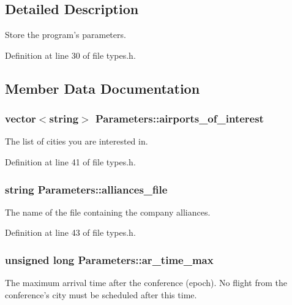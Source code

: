 \subsection{Detailed Description}
Store the program's parameters. 

Definition at line 30 of file types.\-h.



\subsection{Member Data Documentation}
\hypertarget{struct_parameters_a119abefcf756bb820a8b03929bfaaa7d}{
\subsubsection[{airports\-\_\-of\-\_\-interest}]{\setlength{\rightskip}{0pt plus 5cm}vector$<$string$>$ Parameters\-::airports\-\_\-of\-\_\-interest}}\label{struct_parameters_a119abefcf756bb820a8b03929bfaaa7d}
The list of cities you are interested in. 

Definition at line 41 of file types.\-h.

\hypertarget{struct_parameters_a108e892c2cacb8b7cb7d5abe4e0ca2e0}{
\subsubsection[{alliances\-\_\-file}]{\setlength{\rightskip}{0pt plus 5cm}string Parameters\-::alliances\-\_\-file}}\label{struct_parameters_a108e892c2cacb8b7cb7d5abe4e0ca2e0}
The name of the file containing the company alliances. 

Definition at line 43 of file types.\-h.

\hypertarget{struct_parameters_af9c8e3eda9f9dca8c6983a32bdc9e0e4}{
\subsubsection[{ar\-\_\-time\-\_\-max}]{\setlength{\rightskip}{0pt plus 5cm}unsigned long Parameters\-::ar\-\_\-time\-\_\-max}}\label{struct_parameters_af9c8e3eda9f9dca8c6983a32bdc9e0e4}
The maximum arrival time after the conference (epoch). No flight from the conference's city must be scheduled after this time. 

